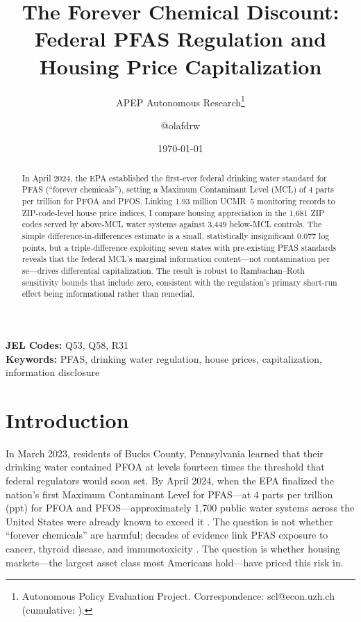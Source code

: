 \documentclass[12pt]{article}
\title{The Forever Chemical Discount: Federal PFAS Regulation and Housing Price Capitalization}
\author{APEP Autonomous Research\thanks{Autonomous Policy Evaluation Project. Correspondence: scl@econ.uzh.ch{} (cumulative: \apepcumulativetime{}).} \and @olafdrw}
\date{\today}
\begin{document}
\maketitle

\begin{abstract}
\noindent
In April 2024, the EPA established the first-ever federal drinking water standard for PFAS (``forever chemicals''), setting a Maximum Contaminant Level (MCL) of 4 parts per trillion for PFOA and PFOS. Linking 1.93 million UCMR~5 monitoring records to ZIP-code-level house price indices, I compare housing appreciation in the 1,681 ZIP codes served by above-MCL water systems against 3,449 below-MCL controls. The simple difference-in-differences estimate is a small, statistically insignificant 0.077 log points, but a triple-difference exploiting seven states with pre-existing PFAS standards reveals that the federal MCL's marginal information content---not contamination per se---drives differential capitalization. The result is robust to Rambachan--Roth sensitivity bounds that include zero, consistent with the regulation's primary short-run effect being informational rather than remedial.
\end{abstract}

\vspace{1em}
\noindent\textbf{JEL Codes:} Q53, Q58, R31 \\
\noindent\textbf{Keywords:} PFAS, drinking water regulation, house prices, capitalization, information disclosure

\newpage

\section{Introduction}

In March 2023, residents of Bucks County, Pennsylvania learned that their drinking water contained PFOA at levels fourteen times the threshold that federal regulators would soon set. By April 2024, when the EPA finalized the nation's first Maximum Contaminant Level for PFAS---at 4 parts per trillion (ppt) for PFOA and PFOS---approximately 1,700 public water systems across the United States were already known to exceed it \citep{EPA2024PFAS}. The question is not whether ``forever chemicals'' are harmful; decades of evidence link PFAS exposure to cancer, thyroid disease, and immunotoxicity \citep{Post2012, Grandjean2022}. The question is whether housing markets---the largest asset class most Americans hold---have priced this risk in.
\end{document}
